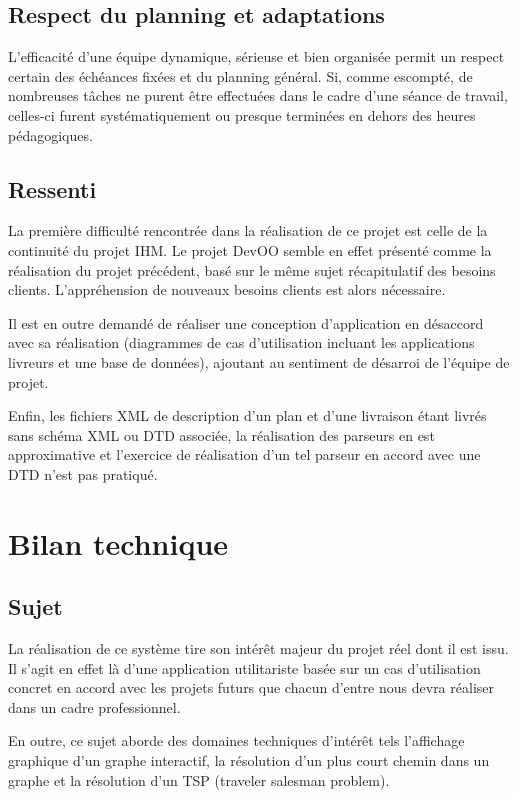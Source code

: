 \subsection{Respect du planning et adaptations}
L’efficacité d’une équipe dynamique, sérieuse et bien organisée permit un respect certain des échéances fixées et du planning général. Si, comme escompté, de nombreuses tâches ne purent être effectuées dans le cadre d’une séance de travail, celles-ci furent systématiquement ou presque terminées en dehors des heures pédagogiques.

\subsection{Ressenti}
La première difficulté rencontrée dans la réalisation de ce projet est celle de la continuité du projet IHM. Le projet DevOO semble en effet présenté comme la réalisation du projet précédent, basé sur le même sujet récapitulatif des besoins clients. L'appréhension de nouveaux besoins clients est alors nécessaire.

Il est en outre demandé de réaliser une conception d'application en désaccord avec sa réalisation (diagrammes de cas d'utilisation incluant les applications livreurs et une base de données), ajoutant au sentiment de désarroi de l'équipe de projet.

Enfin, les fichiers XML de description d'un plan et d'une livraison étant livrés sans schéma XML ou DTD associée, la réalisation des parseurs en est approximative et l'exercice de réalisation d'un tel parseur en accord avec une DTD n'est pas pratiqué.
\clearpage

\section{Bilan technique}
\subsection{Sujet}
La réalisation de ce système tire son intérêt majeur du projet réel dont il est issu. Il s’agit en effet là d’une application utilitariste basée sur un cas d’utilisation concret en accord avec les projets futurs que chacun d’entre nous devra réaliser dans un cadre professionnel.

En outre, ce sujet aborde des domaines techniques d'intérêt tels l'affichage graphique d'un graphe interactif, la résolution d'un plus court chemin dans un graphe et la résolution d'un TSP (traveler salesman problem).

